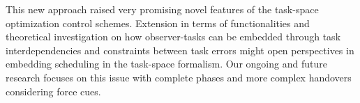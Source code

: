 This new approach raised very promising novel features of the task-space optimization control schemes. Extension in terms of functionalities and theoretical investigation on how observer-tasks can be embedded through task interdependencies and constraints between task errors might open perspectives in embedding scheduling in the task-space formalism. Our ongoing and future research focuses on this issue with complete phases and more complex handovers considering force cues. 




